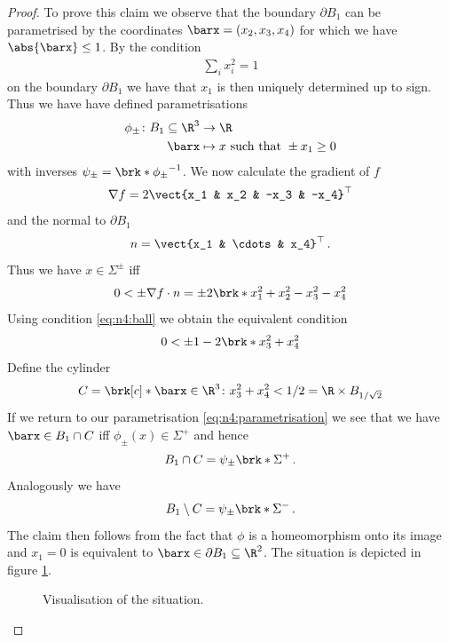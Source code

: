 \begin{proof}
To prove this claim we observe that the boundary $\partial B_1$ can be parametrised by the coordinates $\barx = (x_2,x_3,x_4)$
for which we have $\abs{\barx}\leq 1$. By the condition
\begin{align}
  \sum_i x_i^2 = 1\label{eq:n4:ball}
\end{align}
on the boundary $\partial B_1$ we have that $x_1$ is then uniquely determined up to sign. Thus we have have defined parametrisations
\begin{align}
  \begin{aligned}\phi_\pm\colon B_1\subseteq\R^3&\to\R \\
  \barx&\mapsto x\text{ such that } \pm x_1\geq0
  \end{aligned}\label{eq:n4:parametrisation}
\end{align}
with inverses $\psi_\pm = \brk*{\phi_\pm}^{-1}$.
We now calculate the gradient of $f$
\begin{align*}
  \nabla f = 2\vect{x_1 & x_2 & -x_3 & -x_4}^\top
\end{align*}
and the normal to $\partial B_1$
\begin{align*}
  n = \vect{x_1 & \cdots & x_4}^\top\,.
\end{align*}
Thus we have $x\in\Sigma^\pm$ iff
\begin{align*}
  0<\pm \nabla f\cdot n = \pm 2\brk*{x_1^2+x_2^2-x_3^2-x_4^2}
\end{align*}
Using condition \eqref{eq:n4:ball} we obtain the equivalent condition
\begin{align*}
  0<\pm 1-2\brk*{x_3^2+x_4^2}
\end{align*}
Define the cylinder
\begin{align*}
  C = \brk[c]*{\barx\in \R^3\colon x_3^2+x_4^2<1/2} = \R\times B_{1/\sqrt{2}}
\end{align*}
If we return to our parametrisation \eqref{eq:n4:parametrisation} we see that we have $\barx\in B_1\cap C$ iff
$\phi_\pm(x)\in \Sigma^+$ and hence 
\begin{align*}
  B_1\cap C=\psi_\pm\brk*{\Sigma^+}\,.
\end{align*}
Analogously  we have 
\begin{align*}
  B_1\setminus C=\psi_\pm\brk*{\Sigma^-}\,.
\end{align*}
The claim then follows from the fact that $\phi$ is a homeomorphism onto its image and $x_1=0$ is 
equivalent to $\barx\in \partial B_1\subseteq \R^2$. The situation is depicted in figure \ref{fi:n4_sigma}.

\begin{figure}[h]
  \centering
  \def\svgwidth{0.7\textwidth}
  
  \caption{Visualisation of the situation.}
  \label{fi:n4_sigma}
\end{figure}
\end{proof}



\glsaddall
\printunsrtglossary[type=symbols,style=long]



\nocite{*}
\printbibliography


